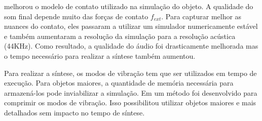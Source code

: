 \cite{zheng2011toward} melhorou o modelo de contato utilizado na simulação do objeto. A qualidade do som final depende muito das forças de contato $f_{ext}$. Para capturar melhor as nuances do contato, eles passaram a utilizar um simulador numericamente estável \cite{kaufman2008staggered} e também aumentaram a resolução da simulação para a resolução acústica (44KHz). Como resultado, a qualidade do áudio foi drasticamente melhorada mas o tempo necessário para realizar a síntese também aumentou.

Para realizar a síntese, os modos de vibração tem que ser utilizados em tempo de execução. Para objetos maiores, a quantidade de memória necessária para armazená-los pode inviabilizar a simulação. Em \cite{langlois2014eigenmode} um método foi desenvolvido para comprimir os modos de vibração. Isso possibilitou utilizar objetos maiores e mais detalhados sem impacto no tempo de síntese. 

